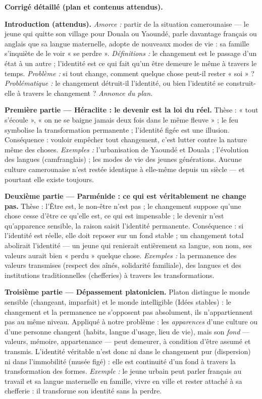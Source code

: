\documentclass[11pt]{article}
\begin{document}
\begin{corrige}
\textbf{Corrigé détaillé (plan et contenus attendus).}

\medskip
\textbf{Introduction (attendus).} \emph{Amorce :} partir de la situation camerounaise — le jeune qui quitte son village pour Douala ou Yaoundé, parle davantage français ou anglais que sa langue maternelle, adopte de nouveaux modes de vie : sa famille s'inquiète de le voir « se perdre ». \emph{Définitions :} le changement est le passage d'un état à un autre ; l'identité est ce qui fait qu'un être demeure le même à travers le temps. \emph{Problème :} si tout change, comment quelque chose peut-il rester « soi » ? \emph{Problématique :} le changement détruit-il l'identité, ou bien l'identité se construit-elle à travers le changement ? \emph{Annonce du plan.}

\medskip
\textbf{Première partie — Héraclite : le devenir est la loi du réel.} Thèse : « tout s'écoule », « on ne se baigne jamais deux fois dans le même fleuve » ; le feu symbolise la transformation permanente ; l'identité figée est une illusion. Conséquence : vouloir empêcher tout changement, c'est lutter contre la nature même des choses. \emph{Exemples :} l'urbanisation de Yaoundé et Douala ; l'évolution des langues (camfranglais) ; les modes de vie des jeunes générations. Aucune culture camerounaise n'est restée identique à elle-même depuis un siècle — et pourtant elle existe toujours.

\medskip
\textbf{Deuxième partie — Parménide : ce qui est véritablement ne change pas.} Thèse : l'Être est, le non-être n'est pas ; le changement suppose qu'une chose cesse d'être ce qu'elle est, ce qui est impensable ; le devenir n'est qu'apparence sensible, la raison saisit l'identité permanente. Conséquence : si l'identité est réelle, elle doit reposer sur un fond stable ; un changement total abolirait l'identité — un jeune qui renierait entièrement sa langue, son nom, ses valeurs aurait bien « perdu » quelque chose. \emph{Exemples :} la permanence des valeurs transmises (respect des aînés, solidarité familiale), des langues et des institutions traditionnelles (chefferies) à travers les transformations.

\medskip
\textbf{Troisième partie — Dépassement platonicien.} Platon distingue le monde sensible (changeant, imparfait) et le monde intelligible (Idées stables) : le changement et la permanence ne s'opposent pas absolument, ils n'appartiennent pas au même niveau. Appliqué à notre problème : les \emph{apparences} d'une culture ou d'une personne changent (habits, langue d'usage, lieu de vie), mais son \emph{fond} — valeurs, mémoire, appartenance — peut demeurer, à condition d'être assumé et transmis. L'identité véritable n'est donc ni dans le changement pur (dispersion) ni dans l'immobilité (musée figé) : elle est continuité d'un fond à travers la transformation des formes. \emph{Exemple :} le jeune urbain peut parler français au travail et sa langue maternelle en famille, vivre en ville et rester attaché à sa chefferie : il transforme son identité sans la perdre.


\end{corrige}
\end{document}
